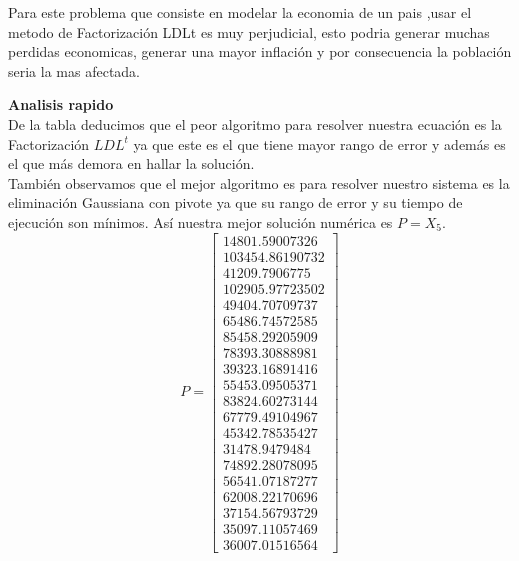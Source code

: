 \documentclass[10pt,a4paper]{article}
\begin{document}
\begin{multicols}{2}
	\noindent Para este problema que consiste en modelar la economia de un pais ,usar el metodo de Factorización LDLt es muy perjudicial, esto podria generar muchas perdidas economicas, generar una mayor inflación y por consecuencia la población seria la mas afectada.
	
	\noindent \textbf{Analisis rapido} \\
	De la tabla deducimos que el peor algoritmo para resolver nuestra ecuación es la Factorización $LDL^t$ ya que este es el que tiene mayor rango de error y además es el que más demora en hallar la solución.\\ También observamos que el mejor algoritmo es para resolver nuestro sistema es la eliminación Gaussiana con pivote ya que su rango de error y su tiempo de ejecución son mínimos. Así nuestra mejor solución numérica es $P=X_5$.
	\begin{equation*}
	P=
	\begin{bmatrix}
	14801.59007326\\  
	103454.86190732\\   
	41209.7906775 \\
	102905.97723502\\   
	49404.70709737\\   
	65486.74572585\\
	85458.29205909\\   
	78393.30888981\\   
	39323.16891416\\
	55453.09505371\\   
	83824.60273144\\   
	67779.49104967\\
	45342.78535427\\   
	31478.9479484 \\   
	74892.28078095\\
	56541.07187277\\   
	62008.22170696\\   
	37154.56793729\\
	35097.11057469\\   
	36007.01516564
	\end{bmatrix}
	\end{equation*}
	

\end{multicols}
\end{document}
